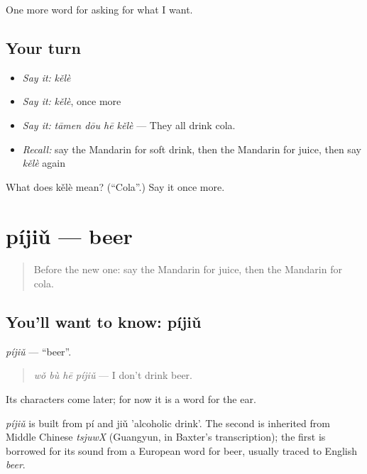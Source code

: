 \begin{grammarlens}[title={What you've built}]
One more word for asking for what I want.
\end{grammarlens}

\subsection*{Your turn}
\begin{itemize}
\raggedright
  \item \emph{Say it:} \emph{kělè}
  \item \emph{Say it:} \emph{kělè}, once more
  \item \emph{Say it:} \emph{tāmen dōu hē kělè} — They all drink cola.
  \item \emph{Recall:} say the Mandarin for soft drink, then the Mandarin for juice, then say \emph{kělè} again
\end{itemize}

\begin{tcolorbox}[breakable,colback=teal!4,colframe=teal!35!black,title={Before you move on}]
What does kělè mean? (\textquotedblleft{}Cola\textquotedblright{}.) Say it once more.
\end{tcolorbox}
\section[píjiǔ]{píjiǔ — beer}

\label{lesson:ZH-C102-pijiu}



\begin{quote}
Before the new one: say the Mandarin for juice, then the Mandarin for cola.
\end{quote}

\subsection*{You'll want to know: píjiǔ}
\emph{píjiǔ} — \textquotedblleft{}beer\textquotedblright{}.

\begin{quote}
\emph{wǒ bù hē píjiǔ} — I don't drink beer.
\end{quote}

Its characters come later; for now it is a word for the ear.

\begin{cousinweb}
\emph{píjiǔ} is built from pí and jiǔ 'alcoholic drink'. The second is inherited from Middle Chinese \emph{tsjuwX} (Guangyun, in Baxter's transcription); the first is borrowed for its sound from a European word for beer, usually traced to English \emph{beer}.
\end{cousinweb}

